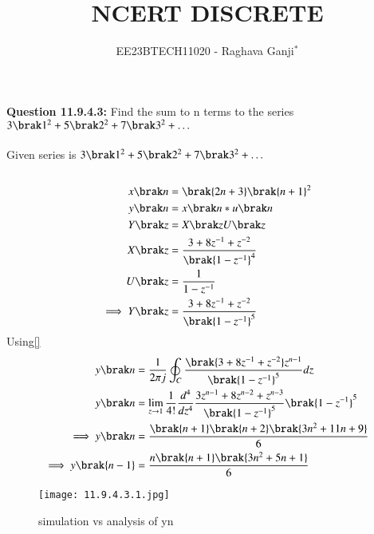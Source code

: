 \documentclass[journal,12pt,twocolumn]{IEEEtran}
\theoremstyle{remark}
\begin{document}

\vspace{3cm}

\title{NCERT DISCRETE}
\author{EE23BTECH11020 - Raghava Ganji$^{*}$%
}
\maketitle
\newpage
\bigskip

\renewcommand{\thefigure}{\theenumi}
\renewcommand{\thetable}{\theenumi}
\textbf{Question 11.9.4.3:}
Find the sum to n terms to the series $3\brak 1^2+5\brak 2^2+7\brak 3^2+ \ldots$\\ 
\solution\\
Given series is $3\brak 1^2+5\brak 2^2+7\brak 3^2+ \ldots$\\\\

\begin{align}
x\brak n&=\brak{2n+3}\brak{n+1}^2\\
y\brak n&=x\brak n*u\brak n\\
Y\brak z&=X\brak zU\brak z\\
X\brak z&=\frac{3+8z^{-1}+z^{-2}}{\brak{1-z^{-1}}^4}\\
U\brak z&=\frac{1}{1-z^{-1}}\\
\implies Y\brak z&=\frac{3+8z^{-1}+z^{-2}}{\brak{1-z^{-1}}^5}
\end{align}
Using\eqref{}
\begin{align}
y\brak n&=\frac{1}{2\pi j}\oint_C\frac{\brak{3+8z^{-1}+z^{-2}}z^{n-1}}{\brak{1-z^{-1}}^5}dz\nonumber  \\
y\brak n&=\lim_{z\to 1}\frac{1}{4!}\frac{d^4}{dz^4}\frac{3z^{n-1}+8z^{n-2}+z^{n-3}}{\brak{1-z^{-1}}^5}\brak {1-z^{-1}}^5\\
\implies y\brak n&=\frac{\brak{n+1}\brak{n+2}\brak{3n^2+11n+9}}{6}\\
\implies y\brak {n-1}&=\frac{n\brak{n+1}\brak{3n^2+5n+1}}{6}
\end{align}
\begin{figure}
    \centering
    \texttt{[image: 11.9.4.3.1.jpg]}
    \caption{simulation vs analysis of y\brak n}
\end{figure}
\end{document}
